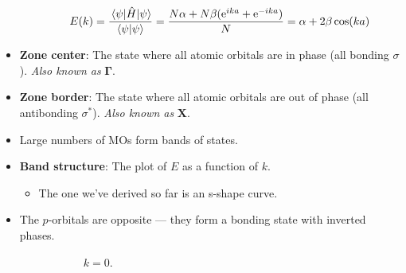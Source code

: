 \documentclass[../notes.tex]{subfiles}
\begin{document}
\begin{itemize}
\begin{itemize}
\begin{equation*}
            E(k) = \frac{\ev{\hat{H}}{\psi}}{\braket{\psi}} = \frac{N\alpha+N\beta(\e[ika]+\e[-ika])}{N} = \alpha+2\beta\cos(ka)
        \end{equation*}
    \end{itemize}
    \item \textbf{Zone center}: The state where all atomic orbitals are in phase (all bonding $\sigma$). \emph{Also known as} $\bm{\Gamma}$.
    \item \textbf{Zone border}: The state where all atomic orbitals are out of phase (all antibonding $\sigma^*$). \emph{Also known as} $\bm{X}$.
    \item Large numbers of MOs form bands of states.
    \item \textbf{Band structure}: The plot of $E$ as a function of $k$.
    \begin{itemize}
        \item The one we've derived so far is an s-shape curve.
    \end{itemize}
    \item The $p$-orbitals are opposite --- they form a bonding state with inverted phases.
    \begin{figure}[h!]
        \centering
        \begin{subfigure}[b]{0.35\linewidth}
            \centering
            \caption{$k=0$.}
            \label{fig:bandBonding-pa}
        \end{subfigure}
        \begin{subfigure}[b]{0.35\linewidth}
            \centering
\end{subfigure}
\end{figure}
\end{itemize}
\end{document}
